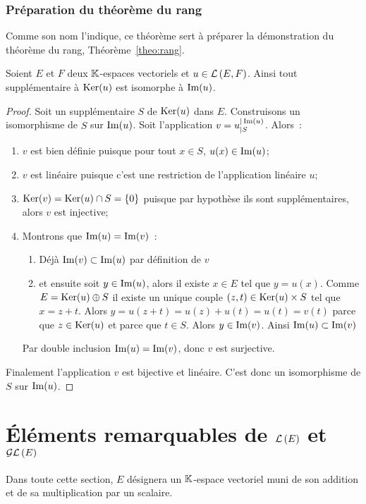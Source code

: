 \subsubsection{Préparation du théorème du rang}
Comme son nom l'indique, ce théorème sert à préparer la démonstration du
théorème du rang, Théorème~\ref{theo:rang}.
\begin{theo}\label{theo:preptheorang}
  Soient \(E\) et \(F\) deux \(\mathbb{K}\)-espaces vectoriels et \(u \in \mathcal{L}\left(E,F\right)\).
  Ainsi tout supplémentaire à \(\operatorname{Ker}(u)\) est isomorphe à \(\operatorname{Im}(u)\).
\end{theo}
\begin{proof}
  Soit un supplémentaire \(S\) de \(\operatorname{Ker}(u)\) dans \(E\). Construisons un
  isomorphisme de \(S\) sur \(\operatorname{Im}(u)\). Soit l'application
  \(v=u_{|S}^{|\operatorname{Im}(u)}\). Alors~:
  \begin{enumerate}
    \item \(v\) est bien définie puisque pour tout \(x \in S\), \(u(x) \in
      \operatorname{Im}(u)\);
    \item \(v\) est linéaire puisque c'est une restriction de l'application
      linéaire \(u\);
    \item \(\operatorname{Ker}(v)=\operatorname{Ker}(u) \cap S =\{0\}\) puisque par hypothèse ils sont
      supplémentaires, alors \(v\) est injective;
    \item Montrons que \(\operatorname{Im}(u)=\operatorname{Im}(v)\)~:
      \begin{enumerate}
        \item Déjà \(\operatorname{Im}(v) \subset \operatorname{Im}(u)\) par définition de \(v\)
        \item et ensuite soit \(y \in \operatorname{Im}(u)\), alors il existe \(x \in E\)
          tel que \(y=u(x)\). Comme \(E=\operatorname{Ker}(u) \oplus S\) il existe un unique
          couple \((z,t) \in \operatorname{Ker}(u) \times S\) tel que \(x=z+t\). Alors
          \(y=u(z+t)=u(z)+u(t)=u(t)=v(t)\) parce que \(z \in \operatorname{Ker}(u)\) et parce
          que \(t \in S\). Alors \(y \in \operatorname{Im}(v)\). Ainsi \(\operatorname{Im}(u) \subset
          \operatorname{Im}(v)\)
      \end{enumerate}
      Par double inclusion \(\operatorname{Im}(u)=\operatorname{Im}(v)\), donc \(v\) est surjective.
  \end{enumerate}
  Finalement l'application \(v\) est bijective et linéaire. C'est donc un
  isomorphisme de \(S\) sur \(\operatorname{Im}(u)\).
\end{proof}

\section{Éléments remarquables de \(\mathcal{L}\left(E\right)\) et \(\mathcal{GL}\left(E\right)\)}
Dans toute cette section, \(E\) désignera un \(\mathbb{K}\)-espace vectoriel muni de son
addition et de sa multiplication par un scalaire.
